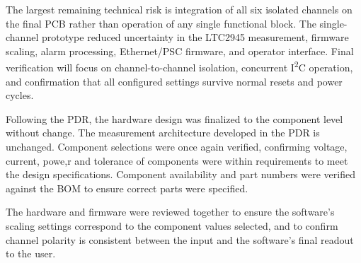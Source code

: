 The largest remaining technical risk is integration of all six isolated channels
on the final PCB rather than operation of any single functional block. The
single-channel prototype reduced uncertainty in the LTC2945 measurement,
firmware scaling, alarm processing, Ethernet/PSC firmware, and operator interface.
Final verification will focus on channel-to-channel isolation,
concurrent I\textsuperscript{2}C operation, and confirmation that all configured settings survive normal resets and power cycles.

\begin{weekthreechange}
    Following the PDR, the hardware design was finalized to the component level without change. The measurement architecture developed in the PDR is unchanged. Component selections were once again verified, confirming voltage, current, powe,r and tolerance of components were within requirements to meet the design specifications. Component availability and part numbers were verified against the BOM to ensure correct parts were specified.

    The hardware and firmware were reviewed together to ensure the software's scaling settings correspond to the component values selected, and to confirm channel polarity is consistent between the input and the software's final readout to the user.
\end{weekthreechange}